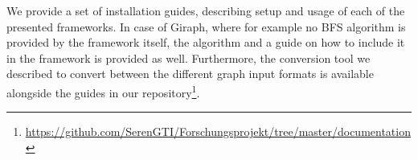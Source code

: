 \documentclass[a4paper]{IEEEtran}
\begin{document}
\appendix
\label{app:installationGuides}\label{app:conversionTool}
We provide a set of installation guides, describing setup and usage of each of the presented frameworks. In case of Giraph, where for example no BFS algorithm is provided by the framework itself, the algorithm and a guide on how to include it in the framework is provided as well. Furthermore, the conversion tool we described to convert between the different graph input formats is available alongside the guides in our repository\footnote{\url{https://github.com/SerenGTI/Forschungsprojekt/tree/master/documentation}}.












% 
% 


\end{document}
